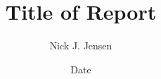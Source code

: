 \documentclass[12pt]{article}
\title{Title of Report}
\author{Nick J. Jensen}
\date{Date}
\begin{document}
\maketitle

\tableofcontents

\clearpage










\clearpage
\appendix
\appendixpage
\addappheadtotoc



\end{document}
